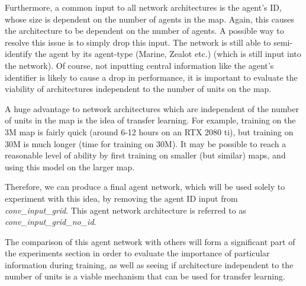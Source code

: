 Furthermore, a common input to all network architectures is the agent's ID, whose size is dependent on the number of agents in the map. Again, this causes the architecture to be dependent on the number of agents. A possible way to resolve this issue is to simply drop this input. The network is still able to semi-identify the agent by its agent-type (Marine, Zealot etc.) (which is still input into the network). Of course, not inputting central information like the agent's identifier is likely to cause a drop in performance, it is important to evaluate the viability of architectures independent to the number of units on the map.

A huge advantage to network architectures which are independent of the number of units in the map is the idea of transfer learning. For example, training on the 3M map is fairly quick (around 6-12 hours on an RTX 2080 ti), but training on 30M is much longer (time for training on 30M). It may be possible to reach a reasonable level of ability by first training on smaller (but similar) maps, and using this model on the larger map.


Therefore, we can produce a final agent network, which will be used solely to experiment with this idea, by removing the agent ID input from \textit{conv\_input\_grid}. This agent network architecture is referred to as \textit{conv\_input\_grid\_no\_id}.


The comparison of this agent network with others will form a significant part of the experiments section in order to evaluate the importance of particular information during training, as well as seeing if architecture independent to the number of units is a viable mechanism that can be used for transfer learning.

